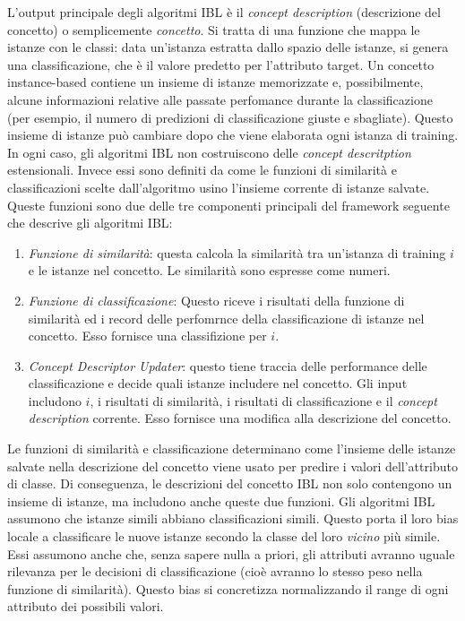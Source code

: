 L'output principale degli algoritmi IBL è il \emph{concept description} (descrizione del concetto) o semplicemente \emph{concetto}. Si tratta di una funzione che mappa le istanze con le classi: data un'istanza estratta dallo spazio delle istanze, si genera una classificazione, che è il valore predetto per l'attributo target.
Un concetto instance-based contiene un insieme di istanze memorizzate e, possibilmente, alcune informazioni relative alle passate perfomance durante la classificazione (per esempio, il numero di predizioni di classificazione giuste e sbagliate). Questo insieme di istanze può cambiare dopo che viene elaborata ogni istanza di training. In ogni caso, gli algoritmi IBL non costruiscono delle \emph{concept descritption} estensionali. Invece essi sono definiti da come le funzioni di similarità e classificazioni scelte dall'algoritmo usino l'insieme corrente di istanze salvate. Queste funzioni sono due delle tre componenti principali del framework seguente che descrive gli algoritmi IBL:

\begin{enumerate}
\item \emph{Funzione di similarità}: questa calcola la similarità tra un'istanza di training $ i $ e le istanze nel concetto. Le similarità sono espresse come numeri.
\item \emph{Funzione di classificazione}: Questo riceve i risultati della funzione di similarità ed i record delle perfomrnce della classificazione di istanze nel concetto. Esso fornisce una classifizione per $ i $.
\item \emph{Concept Descriptor Updater}: questo tiene traccia delle performance delle classificazione e decide quali istanze includere nel concetto. Gli input includono $ i $, i risultati di similarità, i risultati di classificazione e il \emph{concept description} corrente. Esso fornisce una modifica alla descrizione del concetto.
\end{enumerate}

Le funzioni di similarità e classificazione determinano come l'insieme delle istanze salvate nella descrizione del concetto viene usato per predire i valori dell'attributo di classe. Di conseguenza, le descrizioni del concetto IBL non solo contengono un insieme di istanze, ma includono anche queste due funzioni.
Gli algoritmi IBL assumono che istanze simili abbiano classificazioni simili. Questo porta il loro bias locale a classificare le nuove istanze secondo la classe del loro \emph{vicino} più simile. Essi assumono anche che, senza sapere nulla a priori, gli attributi avranno uguale rilevanza per le decisioni di classificazione (cioè avranno lo stesso peso nella funzione di similarità). Questo bias si concretizza normalizzando il range di ogni attributo dei possibili valori.

